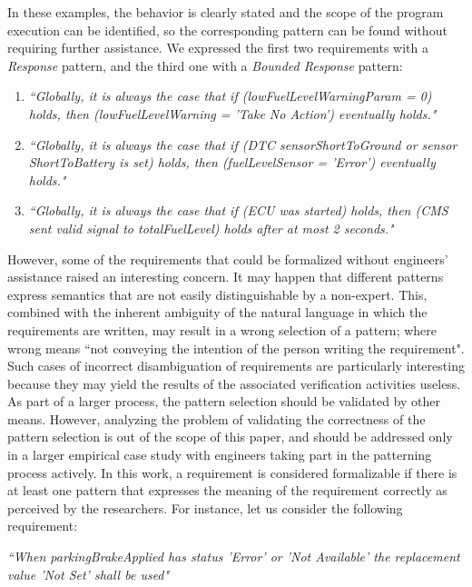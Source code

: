 \documentclass[conference]{IEEEtran}
\begin{document}
In these examples, the behavior is clearly stated and the scope of the program execution can be identified, so the corresponding pattern can be found without requiring further assistance. We expressed the first two requirements with a \textit{Response} pattern, and the third one with a \textit{Bounded Response} pattern:
\begin{enumerate}
\item \textit{``Globally, it is always the case that if (lowFuelLevelWarningParam = 0) holds, then (lowFuelLevelWarning = 'Take No Action') eventually holds."}

\item \textit{``Globally, it is always the case that if (DTC sensorShortToGround or sensor ShortToBattery is set) holds, then (fuelLevelSensor = ’Error’) eventually holds."}

\item \textit{``Globally, it is always the case that if (ECU was started) holds, then (CMS sent valid signal to totalFuelLevel) holds after at most 2 seconds."}\\
\end{enumerate}

However, some of the requirements that could be formalized without engineers' assistance raised an interesting concern. It may happen that different patterns express semantics that are not easily distinguishable by a non-expert. This, combined with the inherent ambiguity of the natural language in which the requirements are written, may result in a wrong selection of a pattern; where wrong means ``not conveying the intention of the person writing the requirement". Such cases of incorrect disambiguation of requirements are particularly interesting because they may yield the results of the associated verification activities useless. As part of a larger process, the pattern selection should be validated by other means. However, analyzing the problem of validating the correctness of the pattern selection is out of the scope of this paper, and should be addressed only in a larger empirical case study with engineers taking part in the patterning process actively. In this work, a requirement is considered formalizable if there is at least one pattern that expresses the meaning of the requirement correctly as perceived by the researchers. For instance, let us consider the following requirement:

\begin{center}
\textit{``When parkingBrakeApplied has status 'Error' or 'Not Available' the replacement value 'Not Set' shall be used"}
\end{center}
\end{document}
